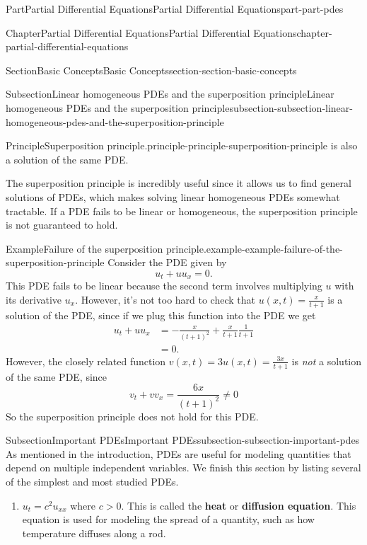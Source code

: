 \documentclass[twoside,10pt,]{book}
\newcommand{\terminology}[1]{\textbf{#1}}
\numberwithin{equation}{part}
\newcommand{\gt}{>}
\newcommand{\amp}{&}
\begin{document}
\begin{partptx}{Part}{Partial Differential Equations}{}{Partial Differential Equations}{}{}{part-part-pdes}
\begin{chapterptx}{Chapter}{Partial Differential Equations}{}{Partial Differential Equations}{}{}{chapter-partial-differential-equations}
\begin{sectionptx}{Section}{Basic Concepts}{}{Basic Concepts}{}{}{section-section-basic-concepts}
\begin{subsectionptx}{Subsection}{Linear homogeneous PDEs and the superposition principle}{}{Linear homogeneous PDEs and the superposition principle}{}{}{subsection-subsection-linear-homogeneous-pdes-and-the-superposition-principle}
\begin{principle}{Principle}{Superposition principle.}{}{principle-principle-superposition-principle}
is also a solution of the same PDE.%
\end{principle}
The superposition principle is incredibly useful since it allows us to find general solutions of PDEs, which makes solving linear homogeneous PDEs somewhat tractable. If a PDE fails to be linear or homogeneous, the superposition principle is not guaranteed to hold.%
\begin{example}{Example}{Failure of the superposition principle.}{example-example-failure-of-the-superposition-principle}%
Consider the PDE given by%
\begin{equation*}
u_{t}+uu_{x} = 0.
\end{equation*}
This PDE fails to be linear because the second term involves multiplying \(u\) with its derivative \(u_{x}\). However, it's not too hard to check that \(u(x,t) = \frac{x}{t+1}\) is a solution of the PDE, since if we plug this function into the PDE we get%
\begin{align*}
u_{t} + uu_{x} \amp = -\frac{x}{(t+1)^{2}} + \frac{x}{t+1}\frac{1}{t+1} \\
\amp = 0 \text{.}
\end{align*}
However, the closely related function \(v(x,t) = 3u(x,t) = \frac{3x}{t+1}\) is \emph{not} a solution of the same PDE, since%
\begin{equation*}
v_{t}+vv_{x} = \frac{6x}{(t+1)^{2}}\neq0
\end{equation*}
So the superposition principle does not hold for this PDE.%
\end{example}
\end{subsectionptx}
%
%
\typeout{************************************************}
\typeout{************************************************}
%
\begin{subsectionptx}{Subsection}{Important PDEs}{}{Important PDEs}{}{}{subsection-subsection-important-pdes}
As mentioned in the introduction, PDEs are useful for modeling quantities that depend on multiple independent variables. We finish this section by listing several of the simplest and most studied PDEs.%
%
\begin{enumerate}
\item{}\(u_{t} = c^{2}u_{xx}\) where \(c\gt0\). This is called the \terminology{heat} or \terminology{diffusion equation}. This equation is used for modeling the spread of a quantity, such as how temperature diffuses along a rod.%

\end{enumerate}
\end{subsectionptx}
\end{sectionptx}
\end{chapterptx}
\end{partptx}
\end{document}
